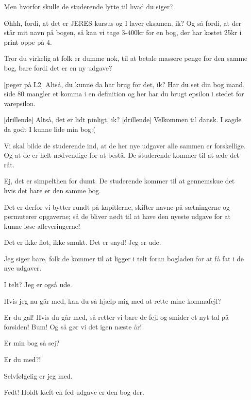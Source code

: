 \documentclass[a4paper,11pt]{article}
\begin{document}
\begin{sketch}
 Men hvorfor skulle de studerende lytte til hvad du siger?

 Øhhh, fordi, at det er JERES kursus og I laver eksamen, ik? 
 Og så fordi, at der står mit navn på bogen, så kan vi tage 3-400kr for en bog, der har kostet 25kr i print oppe på 4. 

 Tror du virkelig at folk er dumme nok, til at betale massere penge for den samme bog, bare fordi det er en ny udgave?

[peger på L2] Altså, du kunne da har brug for det, ik? Har du set din bog mand, side 80 mangler et komma i en definition og her har du brugt epsilon i stedet for varepsilon. 

[drillende] Altså, det er lidt pinligt, ik? 
[drillende] Velkommen til dansk.
 I sagde da godt I kunne lide min bog:(

 Vi skal bilde de studerende ind, at de her nye udgaver alle sammen er forskellige. Og at de er helt nødvendige for at bestå. De studerende kommer til at æde det råt.

 Ej, det er simpelthen for dumt. De studerende kommer til at gennemskue det hvis det bare er den samme bog.

 Det er derfor vi bytter rundt på kapitlerne, skifter navne på sætningerne og permuterer opgaverne; så de bliver nødt til at have den nyeste udgave for at kunne løse afleveringerne!

 Det er ikke flot, ikke smukt. Det er snyd! Jeg er ude.

 Jeg siger bare, folk de kommer til at ligger i telt foran bogladen for at få fat i de nye udgaver. 

 I telt? Jeg er også ude.

 Hvis jeg nu går med, kan du så hjælp mig med at rette mine kommafejl?

 Er du gal! Hvis du går med, så retter vi bare de fejl og smider et nyt tal på forsiden! Bum! Og så gør vi det igen næste år!

 Er min bog så sej?

 Er du med?! 

 Selvfølgelig er jeg med.

 Fedt! 
 Holdt kæft en fed udgave er den bog der.

\end{sketch}
\end{document}
